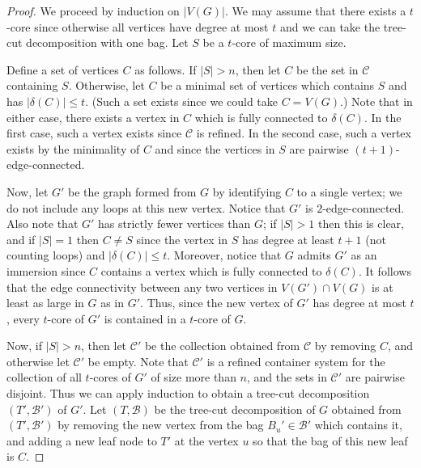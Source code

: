 \documentclass[11pt]{article}
\theoremstyle{definition}
\begin{document}
\begin{proof}
    We proceed by induction on $|V(G)|$. We may assume that there exists a $t$-core since otherwise all vertices have degree at most $t$ and we can take the tree-cut decomposition with one bag. Let $S$ be a $t$-core of maximum size. 
    
    Define a set of vertices $C$ as follows. If $|S|>n$, then let $C$ be the set in $\mathcal{C}$ containing $S$. Otherwise, let $C$ be a minimal set of vertices which contains $S$ and has $|\delta(C)|\leq t$. (Such a set exists since we could take $C=V(G)$.) Note that in either case, there exists a vertex in $C$ which is fully connected to $\delta(C)$. In the first case, such a vertex exists since $\mathcal{C}$ is refined. In the second case, such a vertex exists by the minimality of $C$ and since the vertices in $S$ are pairwise $(t+1)$-edge-connected. %
   
    Now, let $G'$ be the graph formed from $G$ by identifying $C$ to a single vertex; we do not include any loops at this new vertex. Notice that $G'$ is $2$-edge-connected. Also note that $G'$ has strictly fewer vertices than $G$; if $|S|>1$ then this is clear, and if $|S|=1$ then $C \neq S$ since the vertex in $S$ has degree at least $t+1$ (not counting loops) and $|\delta(C)|\leq t$. Moreover, notice that $G$ admits $G'$ as an immersion since $C$ contains a vertex which is fully connected to $\delta(C)$. It follows that the edge connectivity between any two vertices in $V(G') \cap V(G)$ is at least as large in $G$ as in $G'$. Thus, since the new vertex of $G'$ has degree at most $t$, every $t$-core of $G'$ is contained in a $t$-core of $G$.
    
    Now, if $|S|>n$, then let $\mathcal{C}'$ be the collection obtained from $\mathcal{C}$ by removing $C$, and otherwise let $\mathcal{C}'$ be empty. Note that $\mathcal{C}'$ is a refined container system for the collection of all $t$-cores of $G'$ of size more than $n$, and the sets in $\mathcal{C}'$ are pairwise disjoint. Thus we can apply induction to obtain a tree-cut decomposition $(T', \mathscr{B}')$ of $G'$. Let $(T, \mathscr{B})$ be the tree-cut decomposition of $G$ obtained from $(T', \mathscr{B}')$ by removing the new vertex from the bag $B_u' \in \mathscr{B}'$ which contains it, and adding a new leaf node to $T'$ at the vertex $u$ so that the bag of this new leaf is $C$. 
    

\end{proof}
\end{document}
